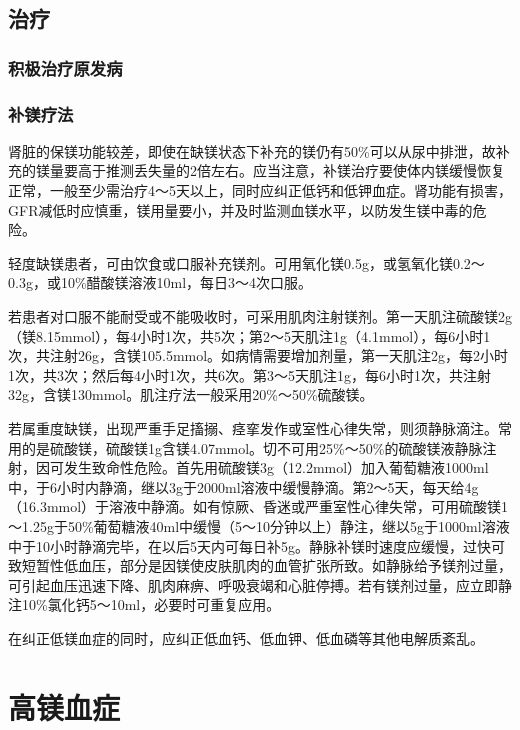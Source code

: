 \subsection{治疗}

\subsubsection{积极治疗原发病}

\subsubsection{补镁疗法}

肾脏的保镁功能较差，即使在缺镁状态下补充的镁仍有50\%可以从尿中排泄，故补充的镁量要高于推测丢失量的2倍左右。应当注意，补镁治疗要使体内镁缓慢恢复正常，一般至少需治疗4～5天以上，同时应纠正低钙和低钾血症。肾功能有损害，GFR减低时应慎重，镁用量要小，并及时监测血镁水平，以防发生镁中毒的危险。

轻度缺镁患者，可由饮食或口服补充镁剂。可用氧化镁0.5g，或氢氧化镁0.2～0.3g，或10\%醋酸镁溶液10ml，每日3～4次口服。

若患者对口服不能耐受或不能吸收时，可采用肌肉注射镁剂。第一天肌注硫酸镁2g（镁8.15mmol），每4小时1次，共5次；第2～5天肌注1g（4.1mmol），每6小时1次，共注射26g，含镁105.5mmol。如病情需要增加剂量，第一天肌注2g，每2小时1次，共3次；然后每4小时1次，共6次。第3～5天肌注1g，每6小时1次，共注射32g，含镁130mmol。肌注疗法一般采用20\%～50\%硫酸镁。

若属重度缺镁，出现严重手足搐搦、痉挛发作或室性心律失常，则须静脉滴注。常用的是硫酸镁，硫酸镁1g含镁4.07mmol。切不可用25\%～50\%的硫酸镁液静脉注射，因可发生致命性危险。首先用硫酸镁3g（12.2mmol）加入葡萄糖液1000ml中，于6小时内静滴，继以3g于2000ml溶液中缓慢静滴。第2～5天，每天给4g（16.3mmol）于溶液中静滴。如有惊厥、昏迷或严重室性心律失常，可用硫酸镁1～1.25g于50\%葡萄糖液40ml中缓慢（5～10分钟以上）静注，继以5g于1000ml溶液中于10小时静滴完毕，在以后5天内可每日补5g。静脉补镁时速度应缓慢，过快可致短暂性低血压，部分是因镁使皮肤肌肉的血管扩张所致。如静脉给予镁剂过量，可引起血压迅速下降、肌肉麻痹、呼吸衰竭和心脏停搏。若有镁剂过量，应立即静注10\%氯化钙5～10ml，必要时可重复应用。

在纠正低镁血症的同时，应纠正低血钙、低血钾、低血磷等其他电解质紊乱。

\protect\hypertarget{text00198.html}{}{}

\section{高镁血症}


